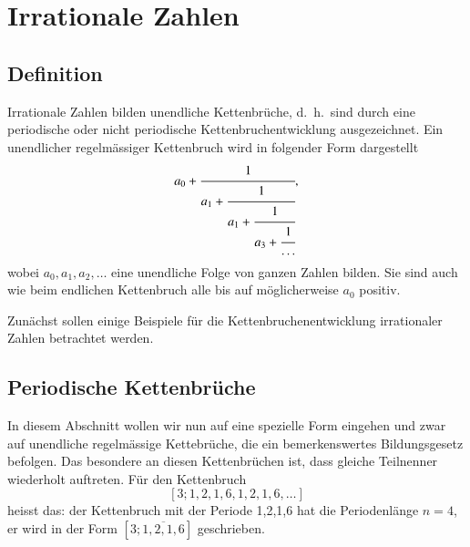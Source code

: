 %
%
%
\section{Irrationale Zahlen
\label{kettenbruch:section:Irrationale Zahlen}}
\subsection{Definition}
Irrationale Zahlen bilden unendliche Kettenbrüche, d.~h.~sind durch
eine periodische oder nicht periodische Kettenbruchentwicklung
ausgezeichnet.
Ein unendlicher regelmässiger Kettenbruch wird in folgender Form dargestellt
\begin{equation}
a_0 + \cfrac{1}{a_1+\cfrac{1}{a_1+\cfrac{1}{a_3+\cfrac{1}{\dots}}}},
\end{equation}
wobei $a_0,a_1,a_2,\dots$ eine unendliche Folge von ganzen Zahlen bilden. 
Sie sind auch wie beim endlichen Kettenbruch
alle bis auf möglicherweise $a_0$ positiv.


Zunächst sollen einige Beispiele für die Kettenbruchenentwicklung
irrationaler Zahlen betrachtet werden.

\subsection{Periodische Kettenbrüche}
In diesem Abschnitt wollen wir nun auf eine spezielle Form eingehen
und zwar auf unendliche regelmässige Kettebrüche, die ein bemerkenswertes
Bildungsgesetz befolgen. Das besondere an diesen Kettenbrüchen ist,
dass gleiche Teilnenner wiederholt auftreten.
Für den Kettenbruch
\[
[3;1,2,1,6,1,2,1,6,\dots]
\]
heisst das: der
Kettenbruch mit der Periode 1,2,1,6 hat die Periodenlänge $n=4$, er
wird in der Form $[3;\overline{1,2,1,6}]$ geschrieben.


